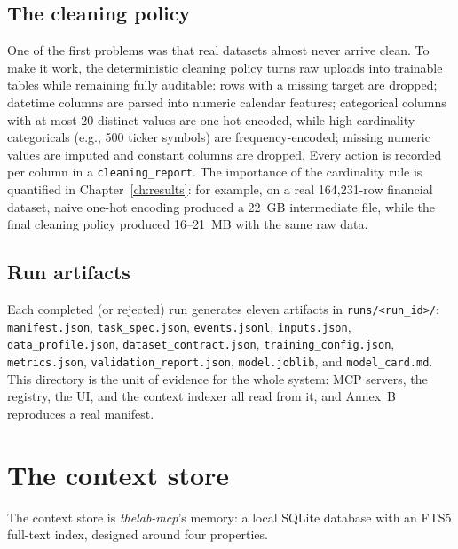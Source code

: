 \subsection{The cleaning policy}

One of the first problems was that real datasets almost never arrive clean. To make it work, the deterministic cleaning policy turns raw uploads into trainable tables while remaining fully auditable: rows with a missing target are dropped; datetime columns are parsed into numeric calendar features; categorical columns with at most 20 distinct values are one-hot encoded, while high-cardinality categoricals (e.g., 500 ticker symbols) are frequency-encoded; missing numeric values are imputed and constant columns are dropped. Every action is recorded per column in a \texttt{cleaning\_report}. The importance of the cardinality rule is quantified in Chapter~\ref{ch:results}: for example, on a real 164{,}231-row financial dataset, naive one-hot encoding produced a 22~GB intermediate file, while the final cleaning policy produced 16--21~MB with the same raw data.

\subsection{Run artifacts}

Each completed (or rejected) run generates eleven artifacts in \texttt{runs/<run\_id>/}: \texttt{manifest.json}, \texttt{task\_spec.json}, \texttt{events.jsonl}, \texttt{inputs.json}, \texttt{data\_profile.json}, \texttt{dataset\_contract.json}, \texttt{training\_config.json}, \texttt{metrics.json}, \texttt{validation\_report.json}, \texttt{model.joblib}, and \texttt{model\_card.md}. This directory is the unit of evidence for the whole system: MCP servers, the registry, the UI, and the context indexer all read from it, and Annex~B reproduces a real manifest.

\section{The context store}
\label{sec:contextstore}

The context store is \emph{thelab-mcp}'s memory: a local SQLite database with an FTS5 full-text index, designed around four properties.

